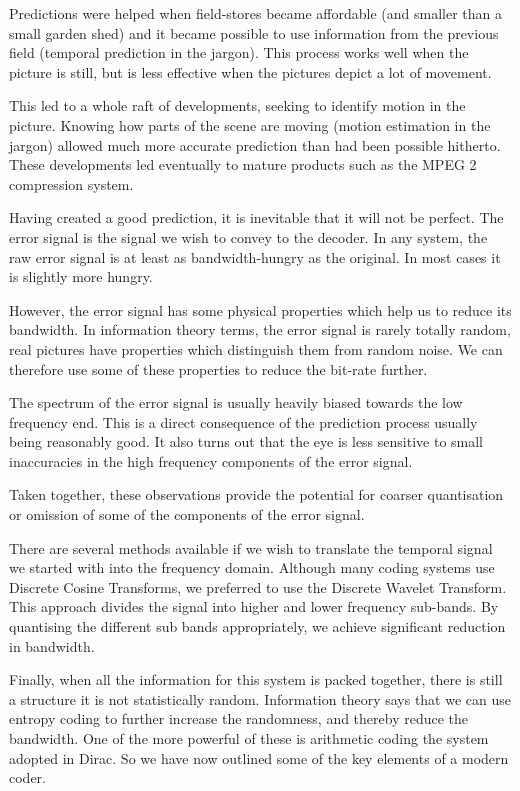 Predictions were helped when field-stores became affordable (and smaller
than a small garden shed) and it became possible to use information from
the previous field (temporal prediction in the jargon). This process
works well when the picture is still, but is less effective when the
pictures depict a lot of movement.

This led to a whole raft of developments, seeking to identify motion in
the picture. Knowing how parts of the scene are moving (motion
estimation in the jargon) allowed much more accurate prediction than had
been possible hitherto. These developments led eventually to mature
products such as the MPEG 2 compression system.

Having created a good prediction, it is inevitable that it will not be
perfect. The error signal is the signal we wish to convey to the
decoder.  In any system, the raw error signal is at least as
bandwidth-hungry as the original. In most cases it is slightly more
hungry.

However, the error signal has some physical properties which help us to
reduce its bandwidth. In information theory terms, the error signal is
rarely totally random, real pictures have properties which distinguish
them from random noise.  We can therefore use some of these properties
to reduce the bit-rate further.

The spectrum of the error signal is usually heavily biased towards the
low frequency end. This is a direct consequence of the prediction
process usually being reasonably good. It also turns out that the eye is
less sensitive to small inaccuracies in the high frequency components of
the error signal.

Taken together, these observations provide the potential for coarser
quantisation or omission of some of the components of the error signal.

There are several methods available if we wish to translate the temporal
signal we started with into the frequency domain. Although many coding
systems use Discrete Cosine Transforms, we preferred to use the Discrete
Wavelet Transform. This approach divides the signal into higher and
lower frequency sub-bands. By quantising the different sub bands
appropriately, we achieve significant reduction in bandwidth.

Finally, when all the information for this system is packed together,
there is still a structure it is not statistically random. Information
theory says that we can use entropy coding to further increase the
randomness, and thereby reduce the bandwidth.  One of the more powerful
of these is arithmetic coding the system adopted in Dirac.  So we have
now outlined some of the key elements of a modern coder.



